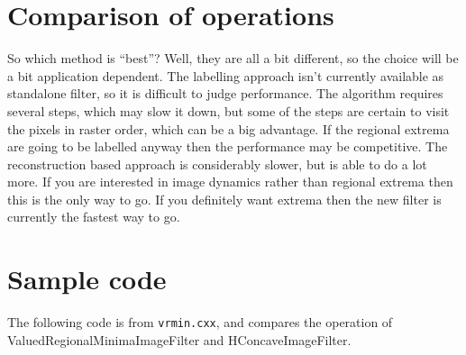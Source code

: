 \documentclass{llncs}
\begin{document}
\section{Comparison of operations}
So which method is ``best''? Well, they are all a bit different, so
the choice will be a bit application dependent. The labelling approach
isn't currently available as standalone filter, so it is difficult to
judge performance. The algorithm requires several steps, which may
slow it down, but some of the steps are certain to visit the pixels in
raster order, which can be a big advantage. If the regional extrema
are going to be labelled anyway then the performance may be
competitive. The reconstruction based approach is considerably slower,
but is able to do a lot more. If you are interested in image dynamics
rather than regional extrema then this is the only way to go. If you
definitely want extrema then the new filter is currently the fastest
way to go.

\section{Sample code}
The following code is from {\tt vrmin.cxx}, and compares the operation
of ValuedRegionalMinimaImageFilter and HConcaveImageFilter.
\end{document}
